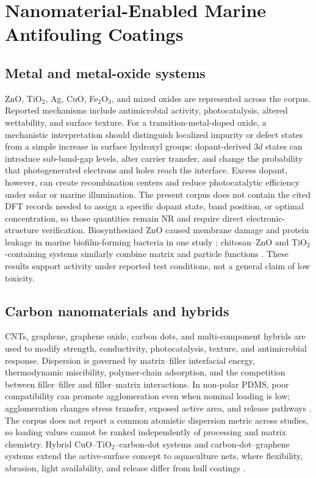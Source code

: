 \section{Nanomaterial-Enabled Marine Antifouling Coatings}
\subsection{Metal and metal-oxide systems}
ZnO, TiO$_2$, Ag, CuO, Fe$_2$O$_3$, and mixed oxides are represented across the corpus. Reported mechanisms include antimicrobial activity, photocatalysis, altered wettability, and surface texture. For a transition-metal-doped oxide, a mechanistic interpretation should distinguish localized impurity or defect states from a simple increase in surface hydroxyl groups: dopant-derived $3d$ states can introduce sub-band-gap levels, alter carrier transfer, and change the probability that photogenerated electrons and holes reach the interface. Excess dopant, however, can create recombination centers and reduce photocatalytic efficiency under solar or marine illumination. The present corpus does not contain the cited DFT records needed to assign a specific dopant state, band position, or optimal concentration, so those quantities remain NR and require direct electronic-structure verification. Biosynthesized ZnO caused membrane damage and protein leakage in marine biofilm-forming bacteria in one study \cite{dharmaraj_protein_2021}; chitosan--ZnO and TiO$_2$-containing systems similarly combine matrix and particle functions \cite{al-naamani_chitosan-zinc_2017,alarif_green_2023}. These results support activity under reported test conditions, not a general claim of low toxicity.

\subsection{Carbon nanomaterials and hybrids}
CNTs, graphene, graphene oxide, carbon dots, and multi-component hybrids are used to modify strength, conductivity, photocatalysis, texture, and antimicrobial response. Dispersion is governed by matrix--filler interfacial energy, thermodynamic miscibility, polymer-chain adsorption, and the competition between filler--filler and filler--matrix interactions. In non-polar PDMS, poor compatibility can promote agglomeration even when nominal loading is low; agglomeration changes stress transfer, exposed active area, and release pathways \cite{cavas_reinforcement_2018}. The corpus does not report a common atomistic dispersion metric across studies, so loading values cannot be ranked independently of processing and matrix chemistry. Hybrid CuO--TiO$_2$--carbon-dot systems and carbon-dot--graphene systems extend the active-surface concept to aquaculture nets, where flexibility, abrasion, light availability, and release differ from hull coatings \cite{ashraf_photocatalytic_2024}.

